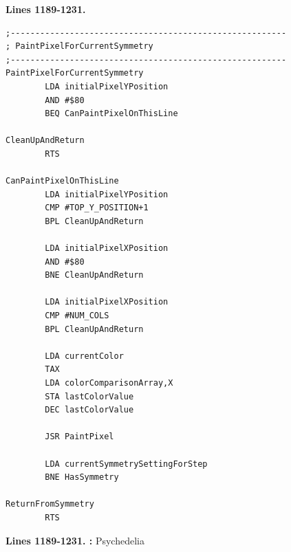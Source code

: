 \clearpage
\textbf{Lines 1189-1231. } 
\begin{lstlisting}[basicstyle=\ttfamily\scriptsize, caption=The routine responsible for painting patterns.]
;--------------------------------------------------------
; PaintPixelForCurrentSymmetry
;--------------------------------------------------------
PaintPixelForCurrentSymmetry   
        LDA initialPixelYPosition
        AND #$80
        BEQ CanPaintPixelOnThisLine

CleanUpAndReturn   
        RTS 

CanPaintPixelOnThisLine   
        LDA initialPixelYPosition
        CMP #TOP_Y_POSITION+1
        BPL CleanUpAndReturn

        LDA initialPixelXPosition
        AND #$80
        BNE CleanUpAndReturn

        LDA initialPixelXPosition
        CMP #NUM_COLS
        BPL CleanUpAndReturn

        LDA currentColor
        TAX 
        LDA colorComparisonArray,X
        STA lastColorValue
        DEC lastColorValue

        JSR PaintPixel

        LDA currentSymmetrySettingForStep
        BNE HasSymmetry

ReturnFromSymmetry   
        RTS 

\end{lstlisting}
\clearpage

\textbf{Lines 1189-1231. :} Psychedelia

